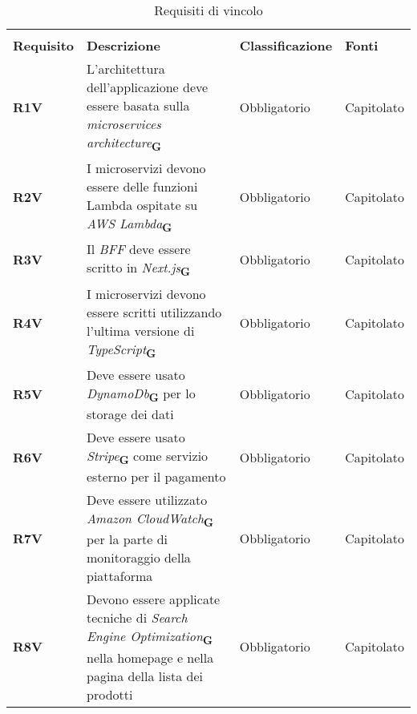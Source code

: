 \begin{center}
    \centering
    \renewcommand{\arraystretch}{1.8}
    \label{tab:RequisitiVincolo}
    \begin{longtable}[!h]{p{50px} p{200px} p{100px} p{50px}}
        \rowcolor{white}\caption{Requisiti di vincolo}                                                                                                                                                                                               \\
        \rowcolor{logo!70} \textbf{Requisito} & \textbf{Descrizione}                                                                                                                                     & \textbf{Classificazione} & \textbf{Fonti} \\
        \textbf{R1V}                          & L'architettura dell'applicazione deve essere basata sulla \textit{microservices architecture}\textsubscript{\textbf{G}}                                 & Obbligatorio             & Capitolato     \\
        \textbf{R2V}                          & I microservizi devono essere delle funzioni \newline Lambda ospitate su \textit{AWS Lambda}\textsubscript{\textbf{G}}                                    & Obbligatorio             & Capitolato     \\
        \textbf{R3V}                          & Il \textit{BFF} deve essere scritto in \textit{Next.js}\textsubscript{\textbf{G}}                                                                        & Obbligatorio             & Capitolato     \\
        \textbf{R4V}                          & I microservizi devono essere scritti utilizzando l'ultima versione di \textit{TypeScript}\textsubscript{\textbf{G}}                                      & Obbligatorio             & Capitolato     \\
        \textbf{R5V}                          & Deve essere usato \textit{DynamoDb}\textsubscript{\textbf{G}} per lo storage dei dati                                                                    & Obbligatorio             & Capitolato     \\
        \textbf{R6V}                          & Deve essere usato \textit{Stripe}\textsubscript{\textbf{G}} come servizio esterno per il pagamento                                                       & Obbligatorio             & Capitolato     \\
        \textbf{R7V}                          & Deve essere utilizzato \textit{Amazon CloudWatch}\textsubscript{\textbf{G}} per la parte di monitoraggio della piattaforma                               & Obbligatorio             & Capitolato     \\
        \textbf{R8V}                          & Devono essere applicate tecniche di \textit{Search Engine Optimization}\textsubscript{\textbf{G}} nella homepage e nella pagina della lista dei prodotti & Obbligatorio             & Capitolato     \\
    \end{longtable}
\end{center}

